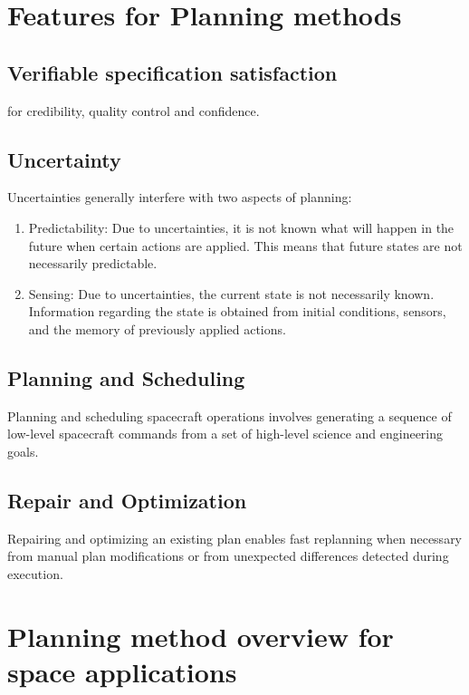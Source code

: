 \documentclass[conference]{IEEEtran}
\begin{document}
\section{Features for Planning methods}
\subsection{\textbf{Verifiable specification satisfaction}}
for credibility, quality control and confidence.

\subsection{\textbf{Uncertainty}} 
Uncertainties generally interfere with two aspects of planning:
\begin{enumerate}
\item Predictability: Due to uncertainties, it is not known what will happen in the future when certain actions are applied. This means that future states are not necessarily predictable.
\item Sensing: Due to uncertainties, the current state is not necessarily known. Information regarding the state is obtained from initial conditions, sensors, and the memory of previously applied actions.
\end{enumerate}

\subsection{\textbf{Planning and Scheduling}}
Planning and scheduling spacecraft operations involves generating a sequence of low-level spacecraft commands from a set of high-level science and engineering goals.
\subsection{\textbf{Repair and Optimization}}
Repairing and optimizing an existing plan enables fast replanning when necessary from manual plan modifications or from unexpected differences detected during execution.

\section{Planning method overview for space applications}

\end{document}
